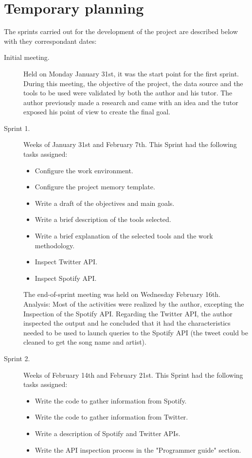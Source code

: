 \section{Temporary planning}
\nonzeroparskip The sprints carried out for the development of the project are described below with they correspondant dates:
\begin{description}
	\item[Initial meeting.] Held on Monday January 31st, it was the start point for the first sprint. During this meeting, the objective of the project, the data source and the tools to be used were validated by both the author and his tutor. The author previously made a research and came with an idea and the tutor exposed his point of view to create the final goal.
	\item[Sprint 1.] Weeks of January 31st and February 7th. This Sprint had the following tasks assigned:
	\begin{itemize}
		\item Configure the work environment.
		\item Configure the project memory template.
		\item Write a draft of the objectives and main goals.
		\item Write a brief description of the tools selected.
		\item Write a brief explanation of the selected tools and the work methodology.
		\item Inspect Twitter API.
		\item Inspect Spotify API.
	\end{itemize}
	The end-of-sprint meeting was held on Wednesday February 16th.
	Analysis: Most of the activities were realized by the author, excepting the Inspection of the Spotify API. Regarding the Twitter API, the author inspected the output and he concluded that it had the characteristics needed to be used to launch queries to the Spotify API (the tweet could be cleaned to get the song name and artist).
	\item[Sprint 2.] Weeks of February 14th and February 21st. This Sprint had the following tasks assigned:
	\begin{itemize}
		\item Write the code to gather information from Spotify.
		\item Write the code to gather information from Twitter.
		\item Write a description of Spotify and Twitter APIs.
		\item Write the API inspection process in the "Programmer guide" section.

\end{itemize}
\end{description}
